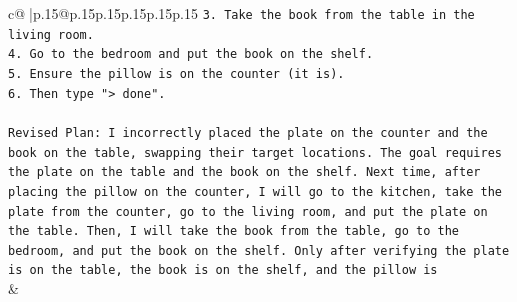 \documentclass{article}
\begin{document}
{\begin{supertabular}{c@{$\;$}|p{.15\linewidth}@{}p{.15\linewidth}p{.15\linewidth}p{.15\linewidth}p{.15\linewidth}p{.15\linewidth}}
{{{\texttt{3. Take the book from the table in the living room.} \\
\texttt{4. Go to the bedroom and put the book on the shelf.} \\
\texttt{5. Ensure the pillow is on the counter (it is).} \\
\texttt{6. Then type "> done".} \\
\\ 
\texttt{Revised Plan: I incorrectly placed the plate on the counter and the book on the table, swapping their target locations. The goal requires the plate on the table and the book on the shelf. Next time, after placing the pillow on the counter, I will go to the kitchen, take the plate from the counter, go to the living room, and put the plate on the table. Then, I will take the book from the table, go to the bedroom, and put the book on the shelf. Only after verifying the plate is on the table, the book is on the shelf, and the pillow is} \\
            }
        }
    }
    & \\ \\

\end{supertabular}
}
\end{document}
